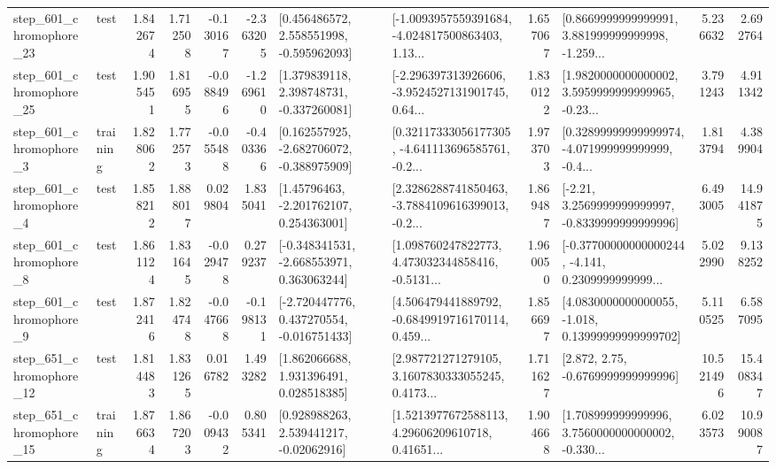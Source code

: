 \begin{tabular}{llrrrrllrlrr}
  step\_601\_chromophore\_23 &      test &      1.842674 &    1.712508 &     -0.130167 & -2.363205 &    [0.456486572, 2.558551998, -0.595962093] &  [-1.0093957559391684, -4.024817500863403, 1.13... &       1.657067 &  [0.8669999999999991, 3.881999999999998, -1.259... &            5.236632 &          2.692764 \\
  step\_601\_chromophore\_25 &      test &      1.905451 &    1.816955 &     -0.088496 & -1.269610 &    [1.379839118, 2.398748731, -0.337260081] &  [-2.296397313926606, -3.9524527131901745, 0.64... &       1.830122 &  [1.9820000000000002, 3.5959999999999965, -0.23... &            3.791243 &          4.911342 \\
   step\_601\_chromophore\_3 &  training &      1.828062 &    1.772573 &     -0.055488 & -0.403366 &   [0.162557925, -2.682706072, -0.388975909] &  [0.32117333056177305, -4.641113696585761, -0.2... &       1.973703 &  [0.32899999999999974, -4.071999999999999, -0.4... &            1.813794 &          4.389904 \\
   step\_601\_chromophore\_4 &      test &      1.858212 &    1.888017 &      0.029804 &  1.835041 &     [1.45796463, -2.201762107, 0.254363001] &  [2.3286288741850463, -3.7884109616399013, -0.2... &       1.869487 &   [-2.21, 3.2569999999999997, -0.8339999999999996] &            6.493005 &         14.941875 \\
   step\_601\_chromophore\_8 &      test &      1.861124 &    1.831645 &     -0.029478 &  0.279237 &   [-0.348341531, -2.668553971, 0.363063244] &  [1.098760247822773, 4.473032344858416, -0.5131... &       1.960050 &  [-0.37700000000000244, -4.141, 0.2309999999999... &            5.022990 &          9.138252 \\
   step\_601\_chromophore\_9 &      test &      1.872416 &    1.824748 &     -0.047668 & -0.198131 &   [-2.720447776, 0.437270554, -0.016751433] &  [4.506479441889792, -0.6849919716170114, 0.459... &       1.856697 &  [4.0830000000000055, -1.018, 0.13999999999999702] &            5.110525 &          6.587095 \\
  step\_651\_chromophore\_12 &      test &      1.814483 &    1.831265 &      0.016782 &  1.493282 &     [1.862066688, 1.931396491, 0.028518385] &  [2.987721271279105, 3.1607830333055245, 0.4173... &       1.711627 &                 [2.872, 2.75, -0.6769999999999996] &           10.521496 &         15.408347 \\
  step\_651\_chromophore\_15 &  training &      1.876634 &    1.867203 &     -0.009432 &  0.805341 &     [0.928988263, 2.539441217, -0.02062916] &  [1.5213977672588113, 4.29606209610718, 0.41651... &       1.904668 &  [1.708999999999996, 3.7560000000000002, -0.330... &            6.023573 &         10.990087 \\

\end{tabular}
